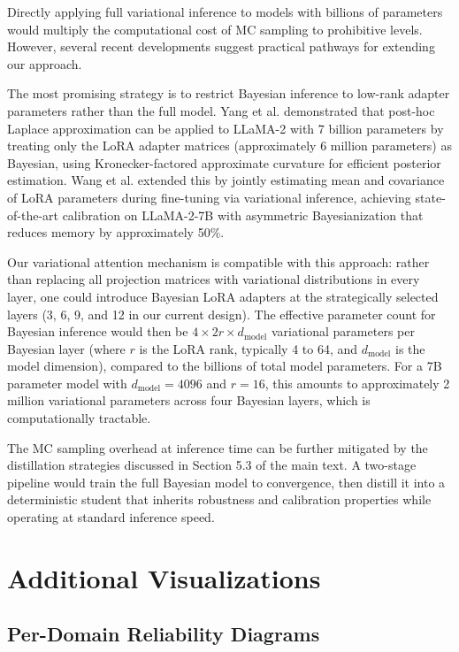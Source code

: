 \documentclass[12pt,a4paper]{article}
\theoremstyle{definition}
\begin{document}
Directly applying full variational inference to models with billions of parameters would multiply the computational cost of MC sampling to prohibitive levels. However, several recent developments suggest practical pathways for extending our approach.

The most promising strategy is to restrict Bayesian inference to low-rank adapter parameters rather than the full model. Yang et al. \citep{yang2024laplace} demonstrated that post-hoc Laplace approximation can be applied to LLaMA-2 with 7 billion parameters by treating only the LoRA adapter matrices (approximately 6 million parameters) as Bayesian, using Kronecker-factored approximate curvature for efficient posterior estimation. Wang et al. \citep{wang2024blob} extended this by jointly estimating mean and covariance of LoRA parameters during fine-tuning via variational inference, achieving state-of-the-art calibration on LLaMA-2-7B with asymmetric Bayesianization that reduces memory by approximately 50\%.

Our variational attention mechanism is compatible with this approach: rather than replacing all projection matrices with variational distributions in every layer, one could introduce Bayesian LoRA adapters at the strategically selected layers (3, 6, 9, and 12 in our current design). The effective parameter count for Bayesian inference would then be $4 \times 2r \times d_{\text{model}}$ variational parameters per Bayesian layer (where $r$ is the LoRA rank, typically 4 to 64, and $d_{\text{model}}$ is the model dimension), compared to the billions of total model parameters. For a 7B parameter model with $d_{\text{model}} = 4096$ and $r = 16$, this amounts to approximately 2 million variational parameters across four Bayesian layers, which is computationally tractable.

The MC sampling overhead at inference time can be further mitigated by the distillation strategies discussed in Section 5.3 of the main text. A two-stage pipeline would train the full Bayesian model to convergence, then distill it into a deterministic student that inherits robustness and calibration properties while operating at standard inference speed.

\section{Additional Visualizations}
\label{app:visualizations}

\subsection{Per-Domain Reliability Diagrams}
\end{document}
